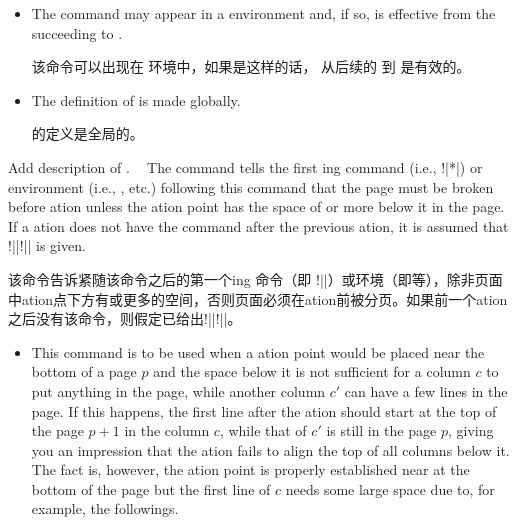 \begin{description}
\begin{itemize}
\!\switchcolumn!命令、\csenv{}和\beginparacol{}的可选参数\sptext{}被视为虚拟列$-1$中的内容，因此如果你需要为\sptext{}添加\Colpream{}，请使用 \!!|{-1}|。
\par\endgroup

\item
The command may appear in a  environment and, if so,
 is effective from the succeeding \cswitch{} to .

该命令可以出现在  环境中，如果是这样的话， 从后续的 \cswitch{} 到  是有效的。
\item
The definition of  is made globally.

 的定义是全局的。
\end{itemize}



\item[\Midx{\!\ensurevspace!}\marg{len}]\mbox{}\par
{}
{Add description of .}

The command tells the first \sync{}ing \cswitch{} command (i.e.,
\!\switchcolumn!|*|) or environment (i.e., , etc.\@)
following this command that the page must be broken before \sync{}ation
unless the \sync{}ation point has the space of  or more below it
in the page.  If a \sync{}ation does not have the command after the
previous \sync{}ation, it is assumed that
\!\ensurevspace!|{|\!\baselineskip!|}| is given.

该命令告诉紧随该命令之后的第一个\sync{}ing \cswitch{}命令（即 \!\switchcolumn!||）或环境（即等），除非页面中\sync{}ation点下方有或更多的空间，否则页面必须在\sync{}ation前被分页。如果前一个\sync{}ation之后没有该命令，则假定已给出\!\ensurevspace!|{|\!\baselineskip!|}|。

\begin{itemize}
\item
This command is to be used when a \sync{}ation point would be placed near
the bottom of a page $p$ and the space below it is not sufficient for a column
$c$ to put anything in the page, while another column $c'$ can have a few
lines in the page.  If this happens, the first line after the \sync{}ation
should start at the top of the page $p+1$ in the column $c$, while that of
$c'$ is still in the page $p$, giving you an impression that the
\sync{}ation fails to align the top of all columns below it.  The fact is,
however, the \sync{}ation point is properly established near at the bottom
of the page but the first line of $c$ needs some large space due to, for
example, the followings.


\end{itemize}
\end{description}

